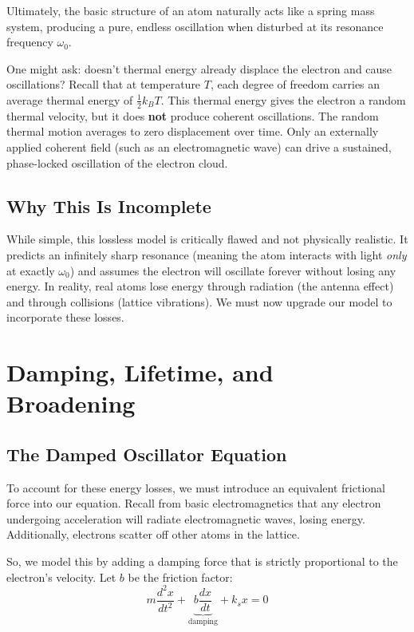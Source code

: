 Ultimately, the basic structure of an atom naturally acts like a spring mass system, producing a pure, endless oscillation when disturbed at its resonance frequency $\omega_0$.

\begin{keyinsight}
    One might ask: doesn't thermal energy already displace the electron and cause oscillations? Recall that at temperature $T$, each degree of freedom carries an average thermal energy of $\frac{1}{2}k_B T$. This thermal energy gives the electron a random thermal velocity, but it does \textbf{not} produce coherent oscillations. The random thermal motion averages to zero displacement over time. Only an externally applied coherent field (such as an electromagnetic wave) can drive a sustained, phase-locked oscillation of the electron cloud.
\end{keyinsight}

\subsection{Why This Is Incomplete}
While simple, this lossless model is critically flawed and not physically realistic. It predicts an infinitely sharp resonance (meaning the atom interacts with light \emph{only} at exactly $\omega_0$) and assumes the electron will oscillate forever without losing any energy. In reality, real atoms lose energy through radiation (the antenna effect) and through collisions (lattice vibrations). We must now upgrade our model to incorporate these losses.

\section{Damping, Lifetime, and Broadening}
\subsection{The Damped Oscillator Equation}
To account for these energy losses, we must introduce an equivalent frictional force into our equation. Recall from basic electromagnetics that any electron undergoing acceleration will radiate electromagnetic waves, losing energy. Additionally, electrons scatter off other atoms in the lattice.

So, we model this by adding a damping force that is strictly proportional to the electron's velocity. Let $b$ be the friction factor:
\begin{equation*}
    m\frac{d^2x}{dt^2} + \underbrace{b\frac{dx}{dt}}_{\text{damping}} + k_s x = 0
\end{equation*}

